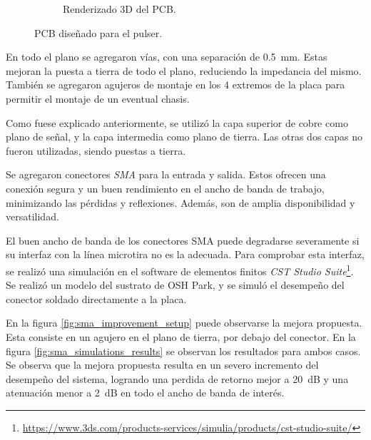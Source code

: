 \begin{figure}
\begin{subfigure}[b]{0.45\textwidth}
        \caption{Renderizado 3D del PCB.}
        \label{fig:pulser_3d}
    \end{subfigure}

    \caption{PCB diseñado para el pulser.}
    \label{fig:pulser_pcb}
\end{figure}

En todo el plano se agregaron vías, con una separación de
\qty{0.5}{\milli\meter}. Estas mejoran la puesta a tierra de todo el plano,
reduciendo la impedancia del mismo. También se agregaron agujeros de montaje en
los 4 extremos de la placa para permitir el montaje de un eventual chasis.

Como fuese explicado anteriormente, se utilizó la capa superior de cobre como
plano de señal, y la capa intermedia como plano de tierra. Las otras dos capas
no fueron utilizadas, siendo puestas a tierra.

Se agregaron conectores \textit{SMA} para la entrada y salida. Estos ofrecen
una conexión segura y un buen rendimiento en el ancho de banda de trabajo,
minimizando las pérdidas y reflexiones. Además, son de amplia disponibilidad y
versatilidad.

El buen ancho de banda de los conectores SMA puede degradarse severamente si su
interfaz con la línea microtira no es la adecuada. Para comprobar esta interfaz,
se realizó una simulación en el software de elementos finitos \textit{CST Studio
Suite}\footnote{\url{https://www.3ds.com/products-services/simulia/products/cst-studio-suite/}}.
Se realizó un modelo del sustrato de OSH Park, y se simuló el desempeño del
conector soldado directamente a la placa.

En la figura \ref{fig:sma_improvement_setup} puede observarse la mejora
propuesta. Esta consiste en un agujero en el plano de tierra, por debajo del
conector. En la figura \ref{fig:sma_simulations_results} se observan los
resultados para ambos casos. Se observa que la mejora propuesta resulta en un
severo incremento del desempeño del sistema, logrando una perdida de retorno
mejor a \qty{20}{\dB} y una atenuación menor a \qty{2}{\dB} en todo el ancho de
banda de interés.

